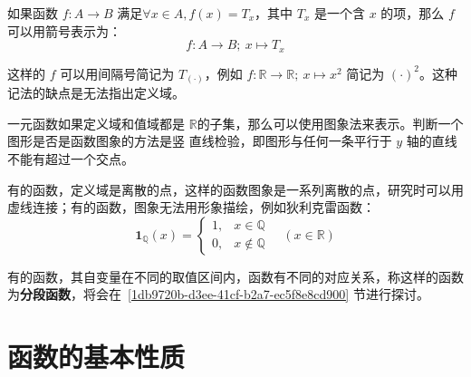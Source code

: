 \documentclass[a4paper,openany]{ctexbook}
\begin{document}
如果函数 \(f:A \rightarrow B\) 满足\(\forall x \in A,f(x)=T_x\)，其中 \(T_x\) 是一个含 \(x\) 的项，那么 \(f\) 可以用箭号表示为：
\[f:A\rightarrow B;\ x\mapsto T_x\]

这样的 \(f\) 可以用间隔号简记为 \(T_{(\cdot)}\)，例如 \(f:\mathbb{R} \rightarrow \mathbb{R} ;\ x\mapsto x^2\) 简记为 \((\cdot)^2\)。这种记法的缺点是无法指出定义域。

一元函数如果定义域和值域都是 \(\mathbb{R} \)的子集，那么可以使用图象法来表示。判断一个图形是否是函数图象的方法是竖
直线检验，即图形与任何一条平行于 \(y\) 轴的直线不能有超过一个交点。

有的函数，定义域是离散的点，这样的函数图象是一系列离散的点，研究时可以用虚线连接；有的函数，图象无法用形象描绘，例如狄利克雷函数：%
\[
    \mathbf{1}_\mathbb{Q}(x)=\begin{cases}
        1, & x\in \mathbb{Q}       \\
        0, & x \not \in \mathbb{Q}
    \end{cases}
    \quad (x \in \mathbb{R})
\]

有的函数，其自变量在不同的取值区间内，函数有不同的对应关系，称这样的函数为\textbf{分段函数}，将会在~\ref{1db9720b-d3ee-41cf-b2a7-ec5f8e8cd900} 节进行探讨。

\section{函数的基本性质}
\end{document}
